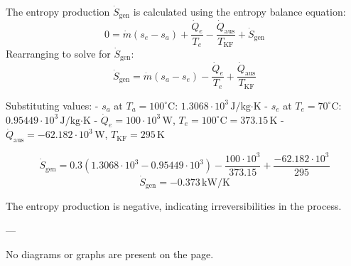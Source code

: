 The entropy production \( \dot{S}_{\text{gen}} \) is calculated using the entropy balance equation:  
\[
0 = \dot{m}(s_e - s_a) + \frac{\dot{Q}_e}{T_e} - \frac{\dot{Q}_{\text{aus}}}{T_{\text{KF}}} + \dot{S}_{\text{gen}}
\]  
Rearranging to solve for \( \dot{S}_{\text{gen}} \):  
\[
\dot{S}_{\text{gen}} = \dot{m}(s_a - s_e) - \frac{\dot{Q}_e}{T_e} + \frac{\dot{Q}_{\text{aus}}}{T_{\text{KF}}}
\]  

Substituting values:  
- \( s_a \) at \( T_a = 100^\circ\text{C} \): \( 1.3068 \cdot 10^3 \, \text{J/kg·K} \)  
- \( s_e \) at \( T_e = 70^\circ\text{C} \): \( 0.95449 \cdot 10^3 \, \text{J/kg·K} \)  
- \( \dot{Q}_e = 100 \cdot 10^3 \, \text{W} \), \( T_e = 100^\circ\text{C} = 373.15 \, \text{K} \)  
- \( \dot{Q}_{\text{aus}} = -62.182 \cdot 10^3 \, \text{W} \), \( T_{\text{KF}} = 295 \, \text{K} \)  

\[
\dot{S}_{\text{gen}} = 0.3(1.3068 \cdot 10^3 - 0.95449 \cdot 10^3) - \frac{100 \cdot 10^3}{373.15} + \frac{-62.182 \cdot 10^3}{295}
\]  
\[
\dot{S}_{\text{gen}} = -0.373 \, \text{kW/K}
\]  

The entropy production is negative, indicating irreversibilities in the process.  

---

No diagrams or graphs are present on the page.